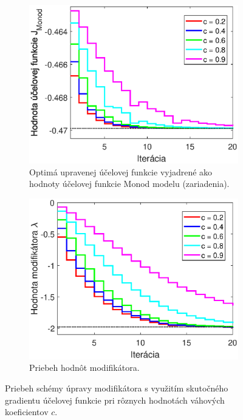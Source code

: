 \begin{figure}
	\centering
	\begin{subfigure}[b]{0.49\textwidth}
		\centering
		\includegraphics[width=\linewidth]{images/mas_woNoise_costFun}
		\caption{Optimá upravenej účelovej funkcie vyjadrené ako hodnoty účelovej funkcie Monod modelu (zariadenia).}
		\label{fig:mas_realGrad_costF}
	\end{subfigure}
	\hfill
	\begin{subfigure}[b]{0.49\textwidth}
		\centering
		\includegraphics[width=\linewidth]{images/mas_woNoise_lam}
		\caption{Priebeh hodnôt modifikátora. \newline \newline}
		\label{fig:mas_realGrad_lam}
	\end{subfigure}
	\caption{Priebeh schémy úpravy modifikátora s využitím skutočného gradientu účelovej funkcie pri rôznych hodnotách váhových koeficientov $ c $.}
\end{figure}

